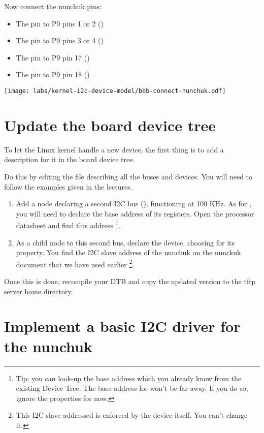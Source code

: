 Now connect the nunchuk pins:
\begin{itemize}
\item The  pin to P9 pins 1 or 2 ()
\item The  pin to P9 pins 3 or 4 ()
\item The  pin to P9 pin 17 ()
\item The  pin to P9 pin 18 ()
\end{itemize}

\begin{center}
\texttt{[image: labs/kernel-i2c-device-model/bbb-connect-nunchuk.pdf]}
\end{center}

\section{Update the board device tree}

To let the Linux kernel handle a new device, the first thing is to add a
description for it in the board device tree.

Do this by editing the 
file describing all the buses and devices. You will need to follow the
examples given in the lectures.

\begin{enumerate}
\item Add a node declaring a second I2C bus (), functioning
  at 100 KHz. As for , you will need to declare the base
  address of its registers. Open the processor datasheet and find this
  address \footnote{Tip: you can look-up the  base address
    which you already know from the existing Device Tree. The base
    address for  won't be far away. If you do so, ignore
    the  properties for now.}.
\item As a child node to this second bus, declare the 
  device, choosing  for its 
  property. You find the I2C slave address of the nunchuk on the
  nunckuk document that we have used earlier \footnote{This I2C slave
    addressed is enforced by the device itself. You can't change it.}.
\end{enumerate}

Once this is done, recompile your DTB and copy the updated version to
the tftp server home directory.

\section{Implement a basic I2C driver for the nunchuk}

